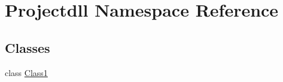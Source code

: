 \hypertarget{namespace_projectdll}{}\section{Projectdll Namespace Reference}
\label{namespace_projectdll}
\subsection*{Classes}
\begin{DoxyCompactItemize}
\item 
class \hyperlink{class_projectdll_1_1_class1}{Class1}
\end{DoxyCompactItemize}
